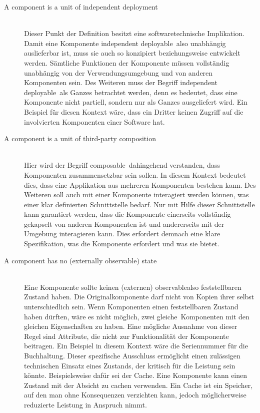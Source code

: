 \begin{description}
\item[A component is a unit of independent deployment] \hfill \\
Dieser Punkt der Definition besitzt eine softwaretechnische Implikation. Damit eine Komponente \glqq independent deployable\grqq\ also unabhängig auslieferbar ist, muss sie auch so konzipiert beziehungsweise entwickelt werden. Sämtliche Funktionen der Komponente müssen vollständig unabhängig von der Verwendungsumgebung und von anderen Komponenten sein. Des Weiteren muss der Begriff \glqq independent deployable\grqq\ als Ganzes betrachtet werden, denn es bedeutet, dass eine Komponente nicht partiell, sondern nur als Ganzes ausgeliefert wird. Ein Beispiel für diesen Kontext wäre, dass ein Dritter keinen Zugriff auf die involvierten Komponenten einer Software hat.\\
\item[A component is a unit of third-party composition] \hfill \\
Hier wird der Begriff \glqq composable\grqq\ dahingehend verstanden, dass Komponenten zusammensetzbar sein sollen. In diesem Kontext bedeutet dies, dass eine Applikation aus mehreren Komponenten bestehen kann. Des Weiteren soll auch mit einer Komponente interagiert werden können, was einer klar definierten Schnittstelle bedarf. Nur mit Hilfe dieser Schnittstelle kann garantiert werden, dass die Komponente einerseits vollständig gekapselt von anderen Komponenten ist und andererseits mit der Umgebung interagieren kann. Dies erfordert demnach eine klare Spezifikation, was die Komponente erfordert und was sie bietet.
\item[A component has no (externally observable) state] \hfill \\
Eine Komponente sollte keinen (externen) \glqq observable\grqq also feststellbaren Zustand haben. Die Originalkomponente darf nicht von Kopien ihrer selbst unterschiedlich sein. Wenn Komponenten einen feststellbaren Zustand haben dürften, wäre es nicht möglich, zwei \glqq gleiche\grqq\ Komponenten mit den gleichen Eigenschaften zu haben. Eine mögliche Ausnahme von dieser Regel sind Attribute, die nicht zur Funktionalität der Komponente beitragen. Ein Beispiel in diesem Kontext wäre die Seriennummer für die Buchhaltung. Dieser spezifische Ausschluss ermöglicht einen zulässigen technischen Einsatz eines Zustands, der kritisch für die Leistung sein könnte. Beispielsweise dafür sei der Cache. Eine Komponente kann einen Zustand mit der Absicht zu cachen verwenden. Ein Cache ist ein Speicher, auf den man ohne Konsequenzen verzichten kann, jedoch möglicherweise reduzierte Leistung in Anspruch nimmt.
\end{description}

